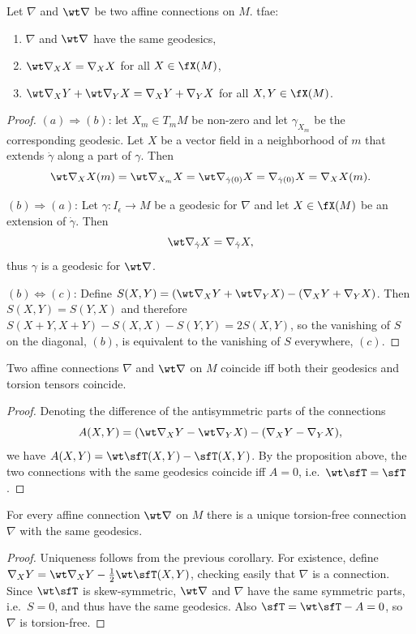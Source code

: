 \begin{prop}\label{prop geodesics coincide}
    Let $\nabla$ and $\wt\nabla$ be two affine connections on $M$. \gls{tfae}:
    \begin{enumerate}[label=(\alph*)]
        \item $\nabla$ and $\wt\nabla$ have the same geodesics,
        \item $\wt\nabla_X X=\nabla_X X$ for all $X\in\fX(M)$,
        \item $\wt\nabla_X Y+\wt\nabla_Y X=\nabla_X Y+\nabla_Y X$ for all $X,Y\in\fX(M)$.
    \end{enumerate}
\end{prop}
\begin{proof}
    $(a)\Rightarrow(b)$: let $X_m\in T_mM$ be non-zero and let $\gamma_{X_m}$ be the corresponding geodesic. Let $X$ be a vector field in a neighborhood of $m$ that extends $\dot\gamma$ along a part of $\gamma$. Then 
    \[\wt\nabla_{X} X(m)=\wt\nabla_{X_m} X=\wt\nabla_{\dot\gamma(0)}X=\nabla_{\dot\gamma(0)}X=\nabla_X X(m).\]


    $(b)\Rightarrow(a)$: Let $\gamma:I_\epsilon\to M$ be a geodesic for $\nabla$ and let $X\in\fX(M)$ be an extension of $\dot\gamma$. Then 
    \[\wt\nabla_{\dot\gamma} X=\nabla_{\dot\gamma}X,\]
    thus $\gamma$ is a geodesic for $\wt\nabla$.

    $(b)\Leftrightarrow(c)$: Define $S(X,Y)=(\wt\nabla_X Y+\wt\nabla_Y X)-(\nabla_X Y+\nabla_Y X)$. Then $S(X,Y)=S(Y,X)$ and therefore $S(X+Y,X+Y)-S(X,X)-S(Y,Y)=2S(X,Y)$, so the vanishing of $S$ on the diagonal, $(b)$, is equivalent to the vanishing of $S$ everywhere, $(c)$.
\end{proof}
\begin{cor}
    Two affine connections $\nabla$ and $\wt\nabla$ on $M$ coincide iff both their geodesics and torsion tensors coincide.
\end{cor}
\begin{proof}
    Denoting the difference of the antisymmetric parts of the connections 
    \[A(X,Y)=(\wt\nabla_X Y-\wt\nabla_Y X)-(\nabla_X Y-\nabla_Y X),\]
    we have $A(X,Y)=\wt\sfT(X,Y)-\sfT(X,Y)$. By the proposition above, the two connections with the same geodesics coincide iff $A=0$, i.e.\ $\wt\sfT=\sfT$.
\end{proof}
\begin{cor}
    For every affine connection $\wt\nabla$ on $M$ there is a unique torsion-free connection $\nabla$ with the same geodesics.
\end{cor}
\begin{proof}
    Uniqueness follows from the previous corollary. For existence, define $\nabla_X Y=\wt\nabla_X Y-\frac12\wt\sfT(X,Y)$, checking easily that $\nabla$ is a connection. Since $\wt\sfT$ is skew-symmetric, $\wt\nabla$ and $\nabla$ have the same symmetric parts, i.e.\ $S=0$, and thus have the same geodesics. Also $\sfT=\wt \sfT-A=0$, so $\nabla$ is torsion-free.
\end{proof}

